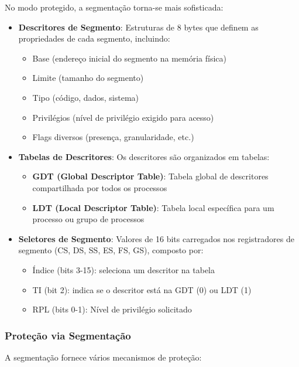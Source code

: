 No modo protegido, a segmentação torna-se mais sofisticada:

\begin{itemize}
    \item \textbf{Descritores de Segmento}: Estruturas de 8 bytes que definem as propriedades de cada segmento, incluindo:
    \begin{itemize}
        \item Base (endereço inicial do segmento na memória física)
        \item Limite (tamanho do segmento)
        \item Tipo (código, dados, sistema)
        \item Privilégios (nível de privilégio exigido para acesso)
        \item Flags diversos (presença, granularidade, etc.)
    \end{itemize}

    \item \textbf{Tabelas de Descritores}: Os descritores são organizados em tabelas:
    \begin{itemize}
        \item \textbf{GDT (Global Descriptor Table)}: Tabela global de descritores compartilhada por todos os processos
        \item \textbf{LDT (Local Descriptor Table)}: Tabela local específica para um processo ou grupo de processos
    \end{itemize}

    \item \textbf{Seletores de Segmento}: Valores de 16 bits carregados nos registradores de segmento (CS, DS, SS, ES, FS, GS), composto por:
    \begin{itemize}
        \item Índice (bits 3-15): seleciona um descritor na tabela
        \item TI (bit 2): indica se o descritor está na GDT (0) ou LDT (1)
        \item RPL (bits 0-1): Nível de privilégio solicitado
    \end{itemize}
\end{itemize}

\subsubsection{Proteção via Segmentação}

A segmentação fornece vários mecanismos de proteção:

